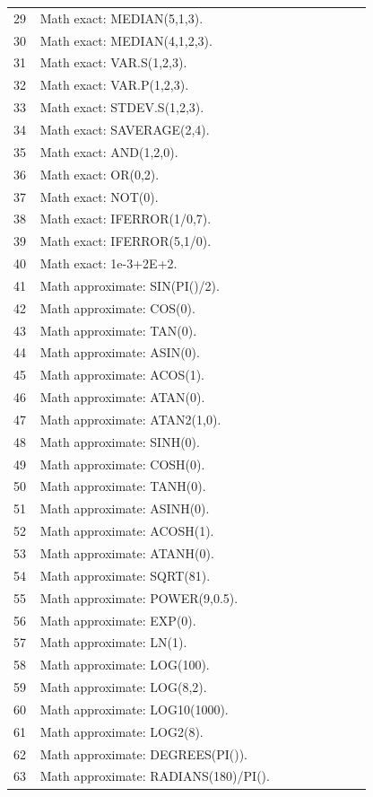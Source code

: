 \documentclass[11pt,letterpaper]{article}
\begin{document}
\begin{longtable}{@{}P{0.07\linewidth}P{0.87\linewidth}@{}}
29 & Math exact: MEDIAN(5,1,3).\\
30 & Math exact: MEDIAN(4,1,2,3).\\
31 & Math exact: VAR.S(1,2,3).\\
32 & Math exact: VAR.P(1,2,3).\\
33 & Math exact: STDEV.S(1,2,3).\\
34 & Math exact: SAVERAGE(2,4).\\
35 & Math exact: AND(1,2,0).\\
36 & Math exact: OR(0,2).\\
37 & Math exact: NOT(0).\\
38 & Math exact: IFERROR(1/0,7).\\
39 & Math exact: IFERROR(5,1/0).\\
40 & Math exact: 1e-3+2E+2.\\
41 & Math approximate: SIN(PI()/2).\\
42 & Math approximate: COS(0).\\
43 & Math approximate: TAN(0).\\
44 & Math approximate: ASIN(0).\\
45 & Math approximate: ACOS(1).\\
46 & Math approximate: ATAN(0).\\
47 & Math approximate: ATAN2(1,0).\\
48 & Math approximate: SINH(0).\\
49 & Math approximate: COSH(0).\\
50 & Math approximate: TANH(0).\\
51 & Math approximate: ASINH(0).\\
52 & Math approximate: ACOSH(1).\\
53 & Math approximate: ATANH(0).\\
54 & Math approximate: SQRT(81).\\
55 & Math approximate: POWER(9,0.5).\\
56 & Math approximate: EXP(0).\\
57 & Math approximate: LN(1).\\
58 & Math approximate: LOG(100).\\
59 & Math approximate: LOG(8,2).\\
60 & Math approximate: LOG10(1000).\\
61 & Math approximate: LOG2(8).\\
62 & Math approximate: DEGREES(PI()).\\
63 & Math approximate: RADIANS(180)/PI().\\

\end{longtable}
\end{document}
